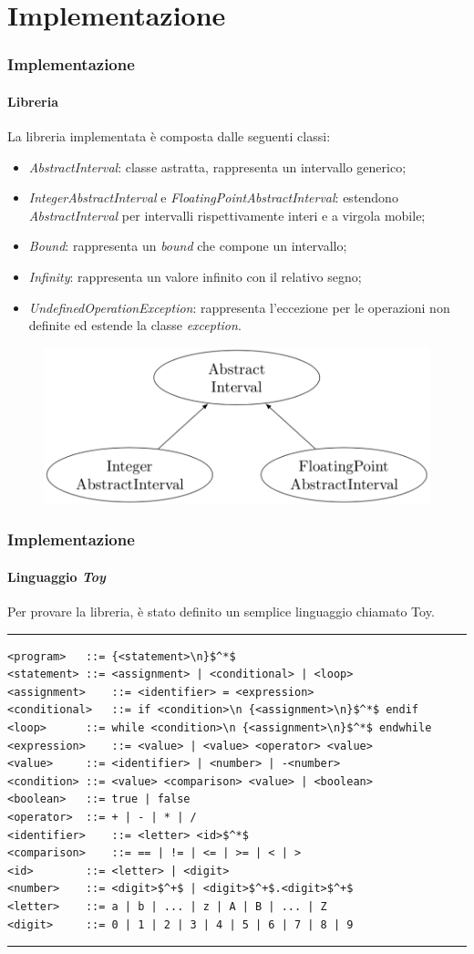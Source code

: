 \documentclass{beamer}
\begin{document}
\section{Implementazione}
	\begin{frame}[fragile]
		\frametitle{Implementazione}
		\framesubtitle{Libreria}
		La libreria implementata è composta dalle seguenti classi:
		\begin{itemize}
			\item \alert{\textit{AbstractInterval}}: classe astratta, rappresenta un intervallo generico;
			\item \alert{\textit{IntegerAbstractInterval}} e \alert{\textit{FloatingPointAbstractInterval}}: estendono \textit{AbstractInterval} per intervalli rispettivamente interi e a virgola mobile;
			\item \alert{\textit{Bound}}: rappresenta un \textit{bound} che compone un intervallo;
			\item \alert{\textit{Infinity}}: rappresenta un valore infinito con il relativo segno;
			\item \alert{\textit{UndefinedOperationException}}: rappresenta l'eccezione per le operazioni non definite ed estende la classe \textit{exception}.
		\end{itemize}
	\begin{figure}[H]
		\centering
		\includegraphics[scale=0.36]{pic}
	\end{figure}
\end{frame}


	\begin{frame}[fragile]			
		\frametitle{Implementazione}
		\framesubtitle{Linguaggio \textit{Toy}}
		Per provare la libreria, è stato definito un semplice linguaggio chiamato \alert{Toy}.\\
		\scriptsize
		\bigskip
		\hrule
\begin{lstlisting}
<program>	::= {<statement>\n}$^*$
<statement>	::= <assignment> | <conditional> | <loop>
<assignment>	::= <identifier> = <expression>
<conditional>	::= if <condition>\n {<assignment>\n}$^*$ endif
<loop>		::= while <condition>\n {<assignment>\n}$^*$ endwhile 
<expression>	::= <value> | <value> <operator> <value>
<value>		::= <identifier> | <number> | -<number>
<condition>	::= <value> <comparison> <value> | <boolean>
<boolean>	::= true | false
<operator>	::= + | - | * | / 
<identifier>	::= <letter> <id>$^*$
<comparison>	::= == | != | <= | >= | < | >
<id>		::= <letter> | <digit>
<number>	::= <digit>$^+$ | <digit>$^+$.<digit>$^+$
<letter>	::= a | b | ... | z | A | B | ... | Z
<digit>		::= 0 | 1 | 2 | 3 | 4 | 5 | 6 | 7 | 8 | 9
\end{lstlisting}
\hrule
\normalsize
\end{frame}
\end{document}
